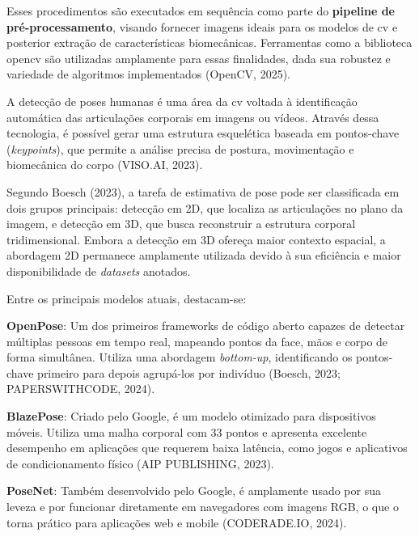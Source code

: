 Esses procedimentos são executados em sequência como parte do \textbf{pipeline de pré-processamento}, visando fornecer imagens ideais para os modelos de \ac{cv} e posterior extração de características biomecânicas. 
Ferramentas como a biblioteca \ac{opencv} são utilizadas amplamente para essas finalidades, dada sua robustez e variedade de algoritmos implementados (OpenCV, 2025).



A detecção de poses humanas é uma área da \ac{cv} voltada à identificação automática das articulações corporais em imagens ou vídeos. 
Através dessa tecnologia, é possível gerar uma estrutura esquelética baseada em pontos-chave (\textit{keypoints}), que permite a análise precisa de postura, movimentação e biomecânica do corpo (VISO.AI, 2023).

Segundo Boesch (2023), a tarefa de estimativa de pose pode ser classificada em dois grupos principais: detecção em 2D, que localiza as articulações no plano da imagem, e detecção em 3D, que busca reconstruir a estrutura corporal tridimensional. 
Embora a detecção em 3D ofereça maior contexto espacial, a abordagem 2D permanece amplamente utilizada devido à sua eficiência e maior disponibilidade de \textit{datasets} anotados.

Entre os principais modelos atuais, destacam-se:

\begin{myitemize}
    \item \textbf{OpenPose}: Um dos primeiros frameworks de código aberto capazes de detectar múltiplas pessoas em tempo real, mapeando pontos da face, mãos e corpo de forma simultânea. 
    Utiliza uma abordagem \textit{bottom-up}, identificando os pontos-chave primeiro para depois agrupá-los por indivíduo (Boesch, 2023; PAPERSWITHCODE, 2024).
    
    \item \textbf{BlazePose}: Criado pelo Google, é um modelo otimizado para dispositivos móveis. Utiliza uma malha corporal com 33 pontos e apresenta excelente desempenho em aplicações que requerem baixa latência, 
    como jogos e aplicativos de condicionamento físico (AIP PUBLISHING, 2023).
    
    \item \textbf{PoseNet}: Também desenvolvido pelo Google, é amplamente usado por sua leveza e por funcionar diretamente em navegadores com imagens RGB, o que o torna prático para aplicações web e mobile (CODERADE.IO, 2024).
\end{myitemize}

